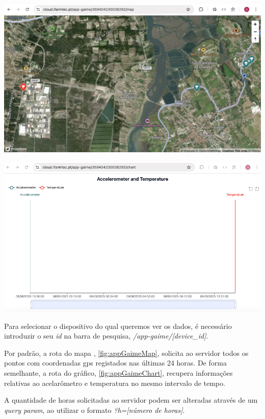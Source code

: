 \begin{multicols}{2}
	\begin{center}
        \centering
		\includegraphics[width=0.8\columnwidth]{figs/appGaimeMap.png}
		\label{fig:appGaimeMap}
	\end{center}

\columnbreak

\begin{center}
		\centering
        \includegraphics[width=0.8\columnwidth]{figs/appGaimeChart.png}
        \label{fig:appGaimeChart}
\end{center}
\end{multicols}

Para selecionar o dispositivo do qual queremos ver os dados, é necessário introduzir o seu \textit{id} na barra de pesquisa, \textit{/app-gaime/[device\_id]}.

Por padrão, a rota do mapa , \autoref{fig:appGaimeMap}, solicita ao servidor todos os pontos com coordenadas \acs{gps} registados nas últimas 24 horas. De forma semelhante, a rota do gráfico, \autoref{fig:appGaimeChart}, recupera informações relativas ao acelarômetro e temperatura no mesmo intervalo de tempo. 

A quantidade de horas solicitadas ao servidor podem ser alteradas através de um \textit{query param}, ao utilizar o formato \textit{?h=[número de horas]}.

